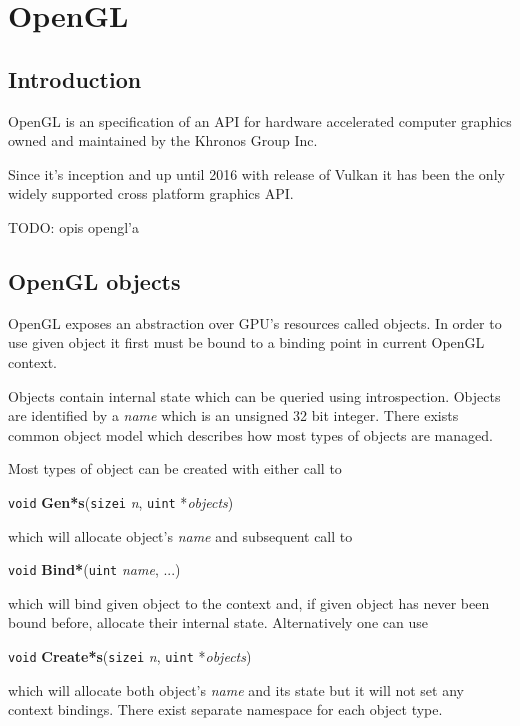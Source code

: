 \chapter{OpenGL}

\section{Introduction}

OpenGL is an specification of an API for hardware accelerated computer graphics owned and maintained by the Khronos Group Inc.

Since it's inception  and up until 2016 with release of Vulkan it has been the only widely supported cross platform graphics API.


TODO: opis opengl'a

\section{OpenGL objects}

OpenGL exposes an abstraction over GPU's resources called objects. In order to use given object it first must be bound to a binding point in current OpenGL context. 

Objects contain internal state which can be queried using introspection. Objects are identified by a \textit{name} which is an unsigned 32 bit integer. There exists common object model which describes how most types of objects are managed.

\noindent Most types of object can be created with either call to\\

\centerline{
    \texttt{void} \textbf{Gen*s}(\texttt{sizei} \textit{n}, \texttt{uint} *\textit{objects})
}
\noindent which will allocate object's \textit{name} and subsequent call to \\

\centerline{
    \texttt{void} \textbf{Bind*}(\texttt{uint} \textit{name}, ...)
}
\noindent which will bind given object to the context and, if given object has never been bound before, allocate their internal state. Alternatively one can use\\

\centerline {
    \texttt{void} \textbf{Create*s}(\texttt{sizei} \textit{n}, \texttt{uint} *\textit{objects})
}
\noindent which will allocate both object's \textit{name} and its state but it will not set any context bindings. There exist separate namespace for each object type.

